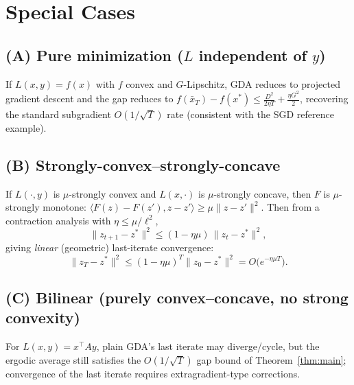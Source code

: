 \documentclass[11pt]{article}
\begin{document}
\section*{Special Cases}

\subsection*{(A) Pure minimization ($L$ independent of $y$)}
If $L(x,y)=f(x)$ with $f$ convex and $G$-Lipschitz, GDA reduces to projected
gradient descent and the gap reduces to $f(\bar x_T)-f(x^*)\le \frac{D^2}{2\eta T}+\frac{\eta G^2}{2}$,
recovering the standard subgradient $O(1/\sqrt T)$ rate (consistent with the
SGD reference example).

\subsection*{(B) Strongly-convex--strongly-concave}
If $L(\cdot,y)$ is $\mu$-strongly convex and $L(x,\cdot)$ is $\mu$-strongly
concave, then $F$ is $\mu$-strongly monotone:
$\langle F(z)-F(z'),z-z'\rangle\ge\mu\|z-z'\|^2$. Then from a contraction
analysis with $\eta\le \mu/\ell^2$,
\[
\|z_{t+1}-z^*\|^2 \le (1-\eta\mu)\,\|z_t-z^*\|^2,
\]
giving \emph{linear} (geometric) last-iterate convergence:
\[
\|z_T - z^*\|^2 \le (1-\eta\mu)^T \|z_0-z^*\|^2 = O\big(e^{-\eta\mu T}\big).
\]

\subsection*{(C) Bilinear (purely convex--concave, no strong convexity)}
For $L(x,y)=x^\top A y$, plain GDA's last iterate may diverge/cycle, but the
ergodic average still satisfies the $O(1/\sqrt T)$ gap bound of
Theorem~\ref{thm:main}; convergence of the last iterate requires
extragradient-type corrections.
\end{document}
